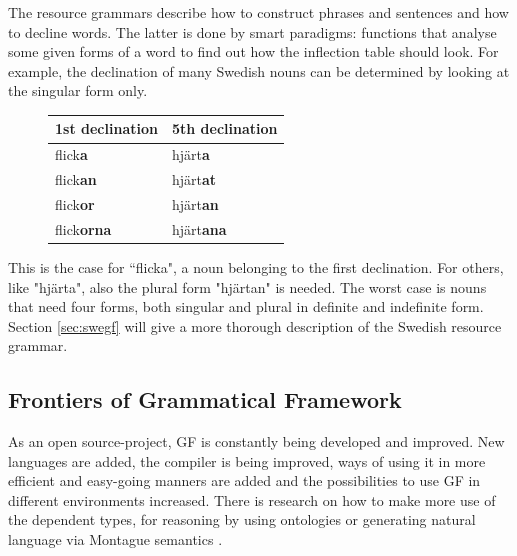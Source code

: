 \documentclass{report}
\begin{document}
The resource grammars describe how to construct phrases and sentences and how to
decline words. The latter is done by smart paradigms: functions that analyse
some given forms of a word to find out how the inflection table should look.
For example, the declination of many Swedish nouns can be determined by looking
at the singular form only. 
\begin{figure}
\begin{tabular}{| l | l |}
\hline
1st declination & 5th declination \\
\hline
flick\textbf{a}    &     hjärt\textbf{a}   \\
flick\textbf{an}    &    hjärt\textbf{at}  \\
flick\textbf{or}    &    hjärt\textbf{an}  \\
flick\textbf{orna}  &    hjärt\textbf{ana} \\
\hline
\end{tabular}
\end{figure}
This is the case for ``flicka", a noun belonging to the first declination. %
For others, like "hjärta", also the plural form "hjärtan" is needed.
The worst case is nouns that need four forms, both singular and
plural in definite and indefinite form.
Section \ref{sec:swegf} will give a more thorough description of the Swedish resource grammar.

\subsection{Frontiers of Grammatical Framework}
As an open source-project, GF is constantly being developed and improved. New
languages are added, the compiler is being improved, ways of using it in more 
efficient and easy-going manners are added
and the possibilities to use GF in different environments
increased. There is research on how to make more use of the dependent
types, for reasoning by using ontologies \cite{ramona} or generating natural
language via Montague semantics \cite{montague}.
\end{document}
